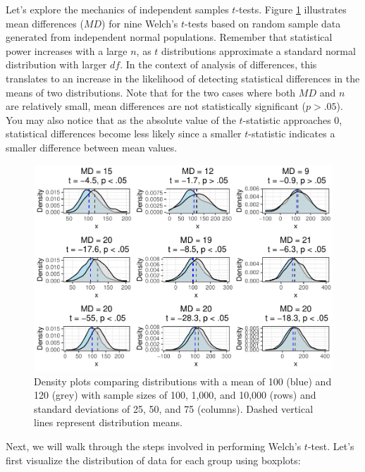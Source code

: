 \documentclass[]{book}
\begin{document}
Let's explore the mechanics of independent samples \(t\)-tests. Figure \ref{fig:mean-group-diff} illustrates mean differences (\(MD\)) for nine Welch's \(t\)-tests based on random sample data generated from independent normal populations. Remember that statistical power increases with a large \(n\), as \(t\) distributions approximate a standard normal distribution with larger \(df\). In the context of analysis of differences, this translates to an increase in the likelihood of detecting statistical differences in the means of two distributions. Note that for the two cases where both \(MD\) and \(n\) are relatively small, mean differences are not statistically significant (\(p > .05\)). You may also notice that as the absolute value of the \(t\)-statistic approaches 0, statistical differences become less likely since a smaller \(t\)-statistic indicates a smaller difference between mean values.

\begin{figure}

{\centering \includegraphics[width=1\linewidth]{People_Analytics_Lifecycle_files/figure-latex/mean-group-diff-1} 

}

\caption{Density plots comparing distributions with a mean of 100 (blue) and 120 (grey) with sample sizes of 100, 1,000, and 10,000 (rows) and standard deviations of 25, 50, and 75 (columns). Dashed vertical lines represent distribution means.}\label{fig:mean-group-diff}
\end{figure}

Next, we will walk through the steps involved in performing Welch's \(t\)-test. Let's first visualize the distribution of data for each group using boxplots:
\end{document}
